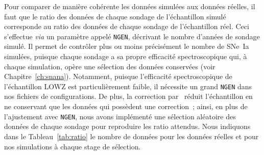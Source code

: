 \documentclass[../main/main.tex]{subfiles}
\begin{document}
Pour comparer de manière cohérente les données simulées aux données réelles, il
faut que le ratio des données de chaque sondage de l'échantillon simulé
corresponde au ratio des données de chaque sondage de l'échantillon réel. Ceci
s'effectue \textit{via} un paramètre appelé \texttt{NGEN}, décrivant le nombre
d'années de sondage simulé. Il permet de contrôler plus ou moins précisément le
nombre de SNe~Ia simulées, puisque chaque sondage a sa propre efficacité
spectroscopique qui, à chaque simulation, opère une sélection des données
conservées (voir Chapitre~\ref{ch:snana}). Notamment, puisque l'efficacité
spectroscopique de l'échantillon LOWZ est particulièrement faible, il nécessite
un grand \texttt{NGEN} dans nos fichiers de configurations. De plus, la
correction par \bbc\ réduit l'échantillon en ne conservant que les données qui
possèdent une correction~; ainsi, en plus de l'ajustement avec \texttt{NGEN},
nous avons implémenté une sélection aléatoire des données de chaque sondage pour
reproduire les ratio attendus. Nous indiquons dans le Tableau~\ref{tab:ratio} le
nombre de données pour les données réelles et pour nos simulations à chaque
stage de sélection.

\end{document}
